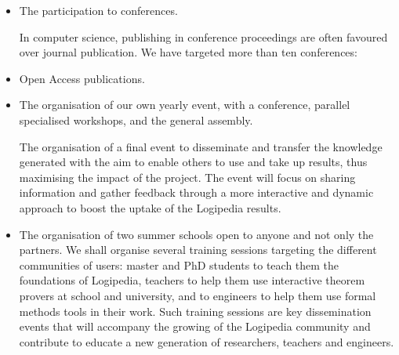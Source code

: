 \begin{itemize}
\item   
The participation to conferences. 

In computer science, publishing in conference
proceedings are often favoured over journal publication. We have targeted
more than ten conferences:
  
\item Open Access publications.

\item
The organisation of our own yearly event, with a conference, parallel
specialised workshops, and the general assembly.

The organisation of a final event to disseminate and transfer the
knowledge generated with the aim to enable others to use and take up
results, thus maximising the impact of the project. The event will
focus on sharing information and gather feedback through a more
interactive and dynamic approach to boost the uptake of the Logipedia
results.

\item
The organisation of two summer schools open to anyone and not only the
partners.  We shall organise several training sessions targeting the
different communities of users: master and PhD students to teach them
the foundations of Logipedia, teachers to help them use interactive
theorem provers at school and university, and to engineers to help
them use formal methods tools in their work. Such training sessions
are key dissemination events that will accompany the growing of the
Logipedia community and contribute to educate a new generation of
researchers, teachers and engineers.


\end{itemize}
